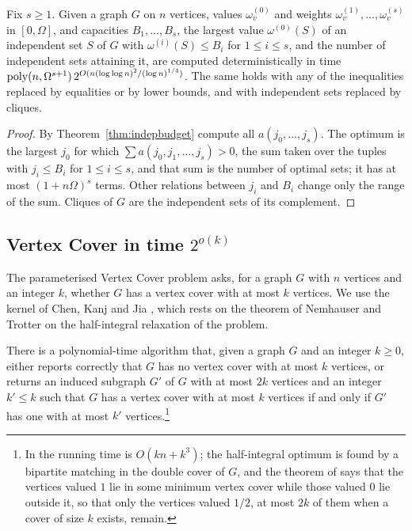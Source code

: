 \begin{corollary}\label{cor:knapsack}
Fix $s\ge1$. Given a graph $G$ on $n$ vertices, values $\omega^{(0)}_v$ and
weights $\omega^{(1)}_v,\dots,\omega^{(s)}_v$ in $[0,\Omega]$, and capacities
$B_1,\dots,B_s$, the largest value $\omega^{(0)}(S)$ of an independent set $S$
of $G$ with $\omega^{(i)}(S)\le B_i$ for $1\le i\le s$, and the number of
independent sets attaining it, are computed deterministically in time
$\operatorname{poly}(n,\Omega^{s+1})\,2^{O(n(\log\log n)^2/(\log n)^{1/4})}$. The same holds
with any of the inequalities replaced by equalities or by lower bounds, and
with independent sets replaced by cliques.
\end{corollary}

\begin{proof}
By Theorem~\ref{thm:indepbudget} compute all $a(j_0,\dots,j_s)$. The optimum is
the largest $j_0$ for which $\sum a(j_0,j_1,\dots,j_s)>0$, the sum taken over
the tuples with $j_i\le B_i$ for $1\le i\le s$, and that sum is the number of
optimal sets; it has at most $(1+n\Omega)^{s}$ terms. Other relations between
$j_i$ and $B_i$ change only the range of the sum. Cliques of $G$ are the
independent sets of its complement.
\end{proof}

\subsection{Vertex Cover in time $2^{o(k)}$}\label{ssec:vc}
The parameterised Vertex Cover problem asks, for a graph $G$ with $n$ vertices
and an integer $k$, whether $G$ has a vertex cover with at most $k$ vertices.
We use the kernel of Chen, Kanj and Jia \cite{CKJ01}, which rests on the theorem
of Nemhauser and Trotter \cite{NT75} on the half-integral relaxation of the
problem.

\begin{theorem}\label{thm:kernel}
There is a polynomial-time algorithm that, given a graph $G$ and an integer
$k\ge0$, either reports correctly that $G$ has no vertex cover with at most
$k$ vertices, or returns an induced subgraph $G'$ of $G$ with at most $2k$
vertices and an integer $k'\le k$ such that $G$ has a vertex cover with at most
$k$ vertices if and only if $G'$ has one with at most $k'$ vertices.\footnote{In
\cite{CKJ01} the running time is $O(kn+k^3)$; the half-integral optimum is
found by a bipartite matching in the double cover of $G$, and the theorem of
\cite{NT75} says that the vertices valued $1$ lie in some minimum vertex cover
while those valued $0$ lie outside it, so that only the vertices valued $1/2$,
at most $2k$ of them when a cover of size $k$ exists, remain.}
\end{theorem}

